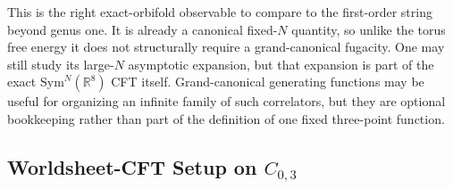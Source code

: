 \documentclass[11pt]{article}
\newcommand{\Sym}{\mathrm{Sym}}
\newcommand{\bR}{\mathbb{R}}
\begin{document}
This is the right exact-orbifold observable to compare to the first-order string beyond genus one. It is already a canonical fixed-$N$ quantity, so unlike the torus free energy it does not structurally require a grand-canonical fugacity. One may still study its large-$N$ asymptotic expansion, but that expansion is part of the exact $\Sym^N(\bR^8)$ CFT itself. Grand-canonical generating functions may be useful for organizing an infinite family of such correlators, but they are optional bookkeeping rather than part of the definition of one fixed three-point function.

\subsection{Worldsheet-CFT Setup on \texorpdfstring{$C_{0,3}$}{C0,3}}
\end{document}
